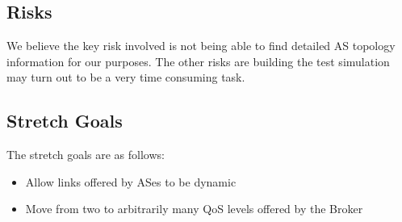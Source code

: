 \subsection*{Risks}

We believe the key risk involved is not being able to find detailed AS topology information for our purposes. The other risks are building the test simulation may turn out to be a very time consuming task.

\subsection*{Stretch Goals}
The stretch goals are as follows:
\begin{itemize}
\item Allow links offered by ASes to be dynamic
\item Move from two to arbitrarily many QoS levels offered by the Broker
\end{itemize}